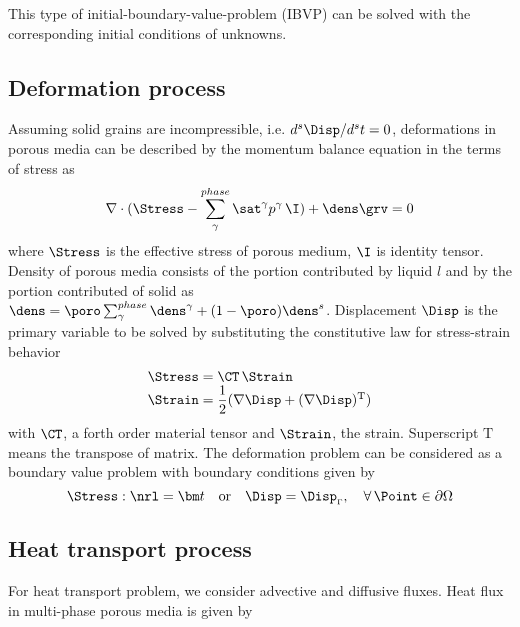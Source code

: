 This type of initial-boundary-value-problem (IBVP) can be solved with
the corresponding initial conditions of unknowns.

\subsection{Deformation process}
\label{sec:deformation}

Assuming solid grains  are incompressible, i.e. $d^s\Disp/d^s t =
0$, deformations in porous media can be described by the momentum
balance equation in the terms of stress as\cite{LewSch82}
\begin{equation}
\nabla \cdot (\Stress -\sum_\gamma^{phase}\sat^\gamma p^\gamma\, \I
) + \dens\grv = 0
\label{eq:momb}
\end{equation}
where $\Stress$ is the effective stress of porous medium, $\I$ is
identity tensor.  Density of porous media consists
of the portion contributed by liquid $l$ and by the portion
contributed of solid as
$\dens=\poro\sum_\gamma^{phase}\dens^\gamma+(1-\poro)\dens^s$.
Displacement $\Disp$ is the primary variable to be solved by
substituting the constitutive law for stress-strain behavior
\begin{equation}
\begin{array}{l}
 \Stress = \CT\, \Strain\\
  \Strain = \dfrac{1}{2}(\nabla \Disp+(\nabla \Disp)^{\mathrm T})
 \end{array}
 \label{eq:strstr}
\end{equation}
with $\CT$, a forth order material tensor and $\Strain$, the
strain. Superscript $\mathrm T$ means the transpose of matrix. The
deformation problem can be considered as a boundary value problem
with boundary conditions given by
\begin{equation}
\Stress : \nrl = \bm t
\quad \mbox{or} \quad
\Disp = \Disp_{\scriptscriptstyle{\Gamma}},
\quad \forall\,\Point \in
\partial \Omega
\label{eq:debc}
\end{equation}

\subsection{Heat transport process}
\label{sec:heat}

For heat transport problem, we consider advective and diffusive
fluxes. Heat flux in multi-phase porous media is given by

